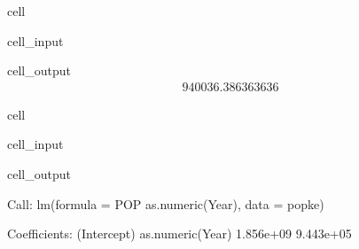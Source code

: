 \documentclass[letterpaper,10pt,english]{jupyterBook}
\begin{document}
\begin{sphinxuseclass}{cell}\begin{sphinxVerbatimInput}

\begin{sphinxuseclass}{cell_input}
\begin{sphinxVerbatim}[commandchars=\\\{\}]
\end{sphinxVerbatim}

\end{sphinxuseclass}\end{sphinxVerbatimInput}
\begin{sphinxVerbatimOutput}

\begin{sphinxuseclass}{cell_output}\begin{equation*}
\begin{split}940036.386363636\end{split}
\end{equation*}
\end{sphinxuseclass}\end{sphinxVerbatimOutput}

\end{sphinxuseclass}
\begin{sphinxuseclass}{cell}\begin{sphinxVerbatimInput}

\begin{sphinxuseclass}{cell_input}
\begin{sphinxVerbatim}[commandchars=\\\{\}]
\end{sphinxVerbatim}

\end{sphinxuseclass}\end{sphinxVerbatimInput}
\begin{sphinxVerbatimOutput}

\begin{sphinxuseclass}{cell_output}
\begin{sphinxVerbatim}[commandchars=\\\{\}]
Call:
lm(formula = POP \PYGZti{} as.numeric(Year), data = pop\PYGZus{}ke)

Coefficients:
     (Intercept)  as.numeric(Year)  
      \PYGZhy{}1.856e+09         9.443e+05  
\end{sphinxVerbatim}

\end{sphinxuseclass}\end{sphinxVerbatimOutput}

\end{sphinxuseclass}
\end{document}
